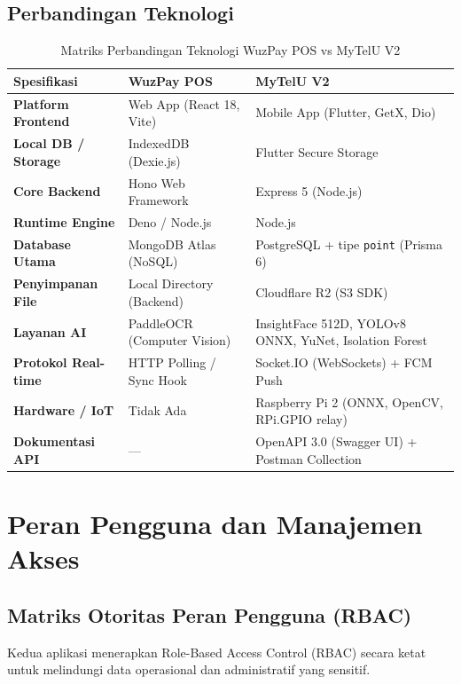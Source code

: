 \documentclass[12pt,titlepage,a4paper]{report}
\begin{document}
\section{Perbandingan Teknologi}
\begin{table}[H]
    \centering
    \caption{Matriks Perbandingan Teknologi WuzPay POS vs MyTelU V2}
    \small
    \renewcommand{\arraystretch}{1.25}
    \begin{tabularx}{\textwidth}{>{\bfseries}p{}YY}
        \toprule
        Spesifikasi & \textbf{WuzPay POS} & \textbf{MyTelU V2} \\
        \midrule
        Platform Frontend & Web App (React 18, Vite) & Mobile App (Flutter, GetX, Dio) \\
        Local DB / Storage & IndexedDB (Dexie.js) & Flutter Secure Storage \\
        Core Backend & Hono Web Framework & Express 5 (Node.js) \\
        Runtime Engine & Deno / Node.js & Node.js \\
        Database Utama & MongoDB Atlas (NoSQL) & PostgreSQL + tipe \texttt{point} (Prisma 6) \\
        Penyimpanan File & Local Directory (Backend) & Cloudflare R2 (S3 SDK) \\
        Layanan AI & PaddleOCR (Computer Vision) & InsightFace 512D, YOLOv8 ONNX, YuNet, Isolation Forest \\
        Protokol Real-time & HTTP Polling / Sync Hook & Socket.IO (WebSockets) + FCM Push \\
        Hardware / IoT & Tidak Ada & Raspberry Pi 2 (ONNX, OpenCV, RPi.GPIO relay) \\
        Dokumentasi API & --- & OpenAPI 3.0 (Swagger UI) + Postman Collection \\
        \bottomrule
    \end{tabularx}
    \label{tab:perbandingan_tech}
\end{table}


\chapter{Peran Pengguna dan Manajemen Akses}

\section{Matriks Otoritas Peran Pengguna (RBAC)}
Kedua aplikasi menerapkan Role-Based Access Control (RBAC) secara ketat untuk melindungi data operasional dan administratif yang sensitif.
\end{document}

